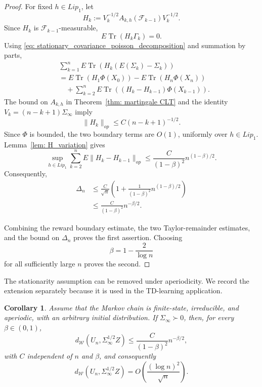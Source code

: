 \documentclass[11pt]{article}
\newtheorem{corollary}{Corollary}
\begin{document}
\begin{proof}
For fixed $h\in Lip_1$, let
\[
H_k
:=
V_k^{-1/2}
A_{k,h}(\mathcal F_{k-1})
V_k^{-1/2}.
\]
Since $H_k$ is $\mathcal F_{k-1}$-measurable,
\[
E\operatorname{Tr}(H_k\Gamma_k)=0.
\]
Using
\eqref{eq: stationary_covariance_poisson_decomposition}
and summation by parts,
\begin{align*}
&\sum_{k=1}^n
E\operatorname{Tr}
\left(
H_k(E(\Sigma_k)-\Sigma_k)
\right)
\\
&=
E\operatorname{Tr}(H_1\Phi(X_0))
-
E\operatorname{Tr}(H_n\Phi(X_n))
\\
&\quad+
\sum_{k=2}^n
E\operatorname{Tr}
\left(
(H_k-H_{k-1})\Phi(X_{k-1})
\right).
\end{align*}
The bound on $A_{k,h}$ in
Theorem~\ref{thm: martingale CLT} and the identity
$V_k=(n-k+1)\Sigma_\infty$ imply
\[
\|H_k\|_{op}
\leq
C(n-k+1)^{-1/2}.
\]
Since $\Phi$ is bounded, the two boundary terms are $O(1)$,
uniformly over $h\in Lip_1$. Lemma~\ref{lem: H_variation} gives
\[
\sup_{h\in Lip_1}
\sum_{k=2}^n
E\|H_k-H_{k-1}\|_{op}
\leq
\frac{C}{(1-\beta)^2}n^{(1-\beta)/2}.
\]
Consequently,
\begin{align*}
\Delta_n
&\leq
\frac{C}{\sqrt n}
\left(
1+
\frac{1}{(1-\beta)^2}n^{(1-\beta)/2}
\right)
\\
&\leq
\frac{C}{(1-\beta)^2}n^{-\beta/2}.
\end{align*}

Combining the reward boundary estimate, the two Taylor-remainder
estimates, and the bound on $\Delta_n$ proves the first assertion.
Choosing
\[
\beta=1-\frac{2}{\log n}
\]
for all sufficiently large $n$ proves the second.
\end{proof}

The stationarity assumption can be removed under aperiodicity. We record the
extension separately because it is used in the TD-learning application.

\begin{corollary}\label{cor: MC CLT nonstationary}
Assume that the Markov chain is finite-state, irreducible, and aperiodic, with
an arbitrary initial distribution. If $\Sigma_\infty\succ0$, then, for every
$\beta\in(0,1)$,
\[
d_{\mathcal W}(U_n,\Sigma_\infty^{1/2}Z)
\le \frac{C}{(1-\beta)^2}n^{-\beta/2},
\]
with $C$ independent of $n$ and $\beta$, and consequently
\[
d_{\mathcal W}(U_n,\Sigma_\infty^{1/2}Z)
=O\left(\frac{(\log n)^2}{\sqrt n}\right).
\]
\end{corollary}
\end{document}
